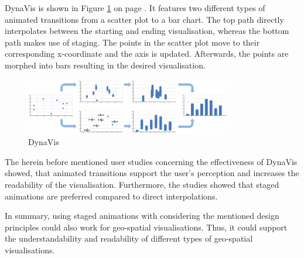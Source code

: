 DynaVis is shown in Figure \ref{fig:dynavis} on page \pageref{fig:dynavis}. It features two different types of animated transitions from a scatter plot to a bar chart. The top path directly interpolates between the starting and ending visualisation, whereas the bottom path makes use of staging. The points in the scatter plot move to their corresponding x-coordinate and the axis is updated. Afterwards, the points are morphed into bars resulting in the desired visualisation.
\cbend

\begin{figure}[!htb]
\centering
\includegraphics[width=0.8\textwidth, keepaspectratio]{images/methods/related/dynavis.png}
\caption[
    DynaVis .
]{DynaVis}
\label{fig:dynavis}
\end{figure}

\cbstart
The herein before mentioned user studies concerning the effectiveness of DynaVis showed, that animated transitions support the user's perception and increases the readability of the visualisation. Furthermore, the studies showed that staged animations are preferred compared to direct interpolations.

In summary, using staged animations with considering the mentioned design principles could also work for geo-spatial visualisations. Thus, it could support the understandability and readability of different types of geo-spatial visualisations.
\cbend